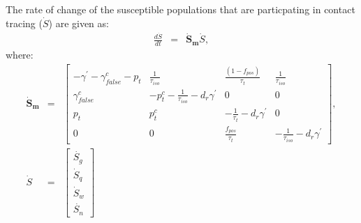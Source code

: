 \documentclass[notitlepage, superscriptaddress]{revtex4-2}
\begin{document}
The rate of change of the susceptible populations that are particpating in contact tracing ($\dot{S}$) are given as:
\begin{eqnarray}
\frac{d\dot{S}}{dt} &=& \boldsymbol{\dot{S}_{m}}  \dot{S},
\end{eqnarray}
where:
\begin{eqnarray}
\boldsymbol{\dot{S}_{m}} &=&
\begin{bmatrix}
-\gamma^{'} -\gamma^{c}_{false} - p_{t}  & \frac{1}{\tau_{iso}}     & \frac{(1-f_{pos})}{\tau_{t}}             & \frac{1}{\tau_{iso}} \\ 
\gamma^{c}_{false}          &  -p^{c}_{t}  - \frac{1}{\tau_{iso}} -d_{r} \gamma^{'}          &  0    & 0  \\ 
p_{t}                          &  p^{c}_{t}                  &  -\frac{1}{\tau_{t}}  -d_{r} \gamma^{'}  & 0 \\
0 & 0 & \frac{f_{pos}}{\tau_{t}}  & -\frac{1}{\tau_{iso}}  -d_{r} \gamma^{'}
\end{bmatrix}, \\
\dot{S} &=& 
\begin{bmatrix}
\dot{S_{g}} \\ \dot{S}_{q} \\ \dot{S}_{w}\\ \dot{S_{n}}
\end{bmatrix}
\end{eqnarray}

\end{document}

